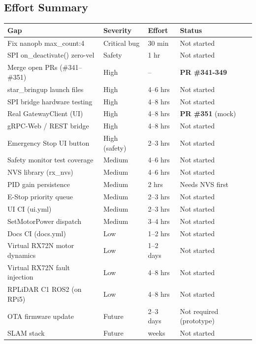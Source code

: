 \documentclass[12pt,a4paper]{article}
\newcommand{\inprogress}[1]{\textcolor{prpurple}{\textbf{PR \##1}}}
\begin{document}
\subsection{Effort Summary}

\begin{center}
\small
\begin{longtable}{L{6cm}L{2.5cm}L{2cm}L{3.5cm}}
  \toprule
  \textbf{Gap} & \textbf{Severity} & \textbf{Effort} & \textbf{Status} \\
  \midrule
  \endhead

  Fix nanopb max\_count:4 & Critical bug & 30 min & Not started \\
  SPI on\_deactivate() zero-vel & Safety & 1 hr & Not started \\
  Merge open PRs (\#341--\#351) & High & -- & \inprogress{341-349} \\
  star\_bringup launch files & High & 4--6 hrs & Not started \\
  SPI bridge hardware testing & High & 4--8 hrs & Not started \\
  Real GatewayClient (UI) & High & 4--8 hrs & \inprogress{351} (mock) \\
  gRPC-Web / REST bridge & High & 4--8 hrs & Not started \\
  Emergency Stop UI button & High (safety) & 2--3 hrs & Not started \\
  Safety monitor test coverage & Medium & 4--6 hrs & Not started \\
  NVS library (rx\_nvs) & Medium & 4--6 hrs & Not started \\
  PID gain persistence & Medium & 2 hrs & Needs NVS first \\
  E-Stop priority queue & Medium & 2--3 hrs & Not started \\
  UI CI (ui.yml) & Medium & 2--3 hrs & Not started \\
  SetMotorPower dispatch & Medium & 3--4 hrs & Not started \\
  Docs CI (docs.yml) & Low & 1--2 hrs & Not started \\
  Virtual RX72N motor dynamics & Low & 1--2 days & Not started \\
  Virtual RX72N fault injection & Low & 4--8 hrs & Not started \\
  RPLiDAR C1 ROS2 (on RPi5) & Low & 4--8 hrs & Not started \\
  OTA firmware update & Future & 2--3 days & Not required (prototype) \\
  SLAM stack & Future & weeks & Not started \\
  \bottomrule
\end{longtable}
\end{center}
\end{document}
